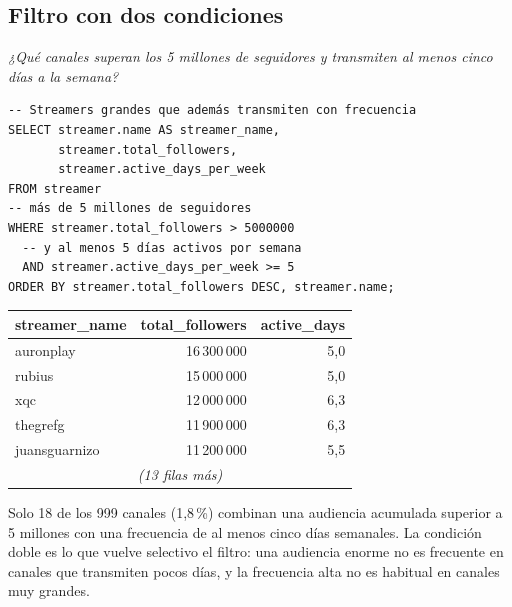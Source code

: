 \documentclass[conference]{IEEEtran}
\begin{document}
\subsection{Filtro con dos condiciones}
\emph{¿Qué canales superan los 5 millones de seguidores y transmiten al menos cinco días a la semana?}
\begin{lstlisting}
-- Streamers grandes que además transmiten con frecuencia
SELECT streamer.name AS streamer_name,
       streamer.total_followers,
       streamer.active_days_per_week
FROM streamer
-- más de 5 millones de seguidores
WHERE streamer.total_followers > 5000000
  -- y al menos 5 días activos por semana
  AND streamer.active_days_per_week >= 5
ORDER BY streamer.total_followers DESC, streamer.name;
\end{lstlisting}
\begin{table}[!h]
\centering\footnotesize
\begin{tabular}{@{}lrr@{}}
\toprule
streamer\_name & total\_followers & active\_days \\
\midrule
auronplay & 16\,300\,000 & 5,0 \\
rubius & 15\,000\,000 & 5,0 \\
xqc & 12\,000\,000 & 6,3 \\
thegrefg & 11\,900\,000 & 6,3 \\
juansguarnizo & 11\,200\,000 & 5,5 \\
\multicolumn{3}{c}{\emph{(13 filas más)}} \\
\bottomrule
\end{tabular}
\end{table}
Solo 18 de los 999 canales (1,8\,\%) combinan una audiencia acumulada superior a 5 millones con una frecuencia de al menos cinco días semanales. La condición doble es lo que vuelve selectivo el filtro: una audiencia enorme no es frecuente en canales que transmiten pocos días, y la frecuencia alta no es habitual en canales muy grandes.
\end{document}
